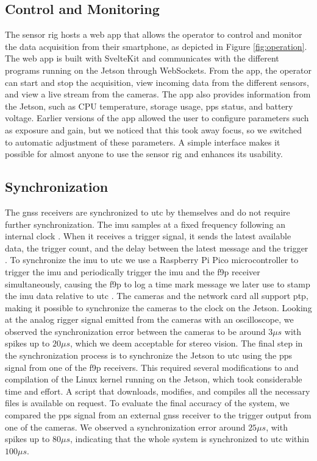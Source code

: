 \subsection{Control and Monitoring}
The sensor rig hosts a web app that allows the operator to control and monitor the data acquisition from their smartphone, as depicted in Figure \ref{fig:operation}.
The web app is built with SvelteKit and communicates with the different programs running on the Jetson through WebSockets.
From the app, the operator can start and stop the acquisition, view incoming data from the different sensors, and view a live stream from the cameras.
The app also provides information from the Jetson, such as CPU temperature, storage usage, \gls{pps} status, and battery voltage.
Earlier versions of the app allowed the user to configure parameters such as exposure and gain, but we noticed that this took away focus, so we switched to automatic adjustment of these parameters.
A simple interface makes it possible for almost anyone to use the sensor rig and enhances its usability.


\subsection{Synchronization}
The \gls{gnss} receivers are synchronized to \gls{utc} by themselves and do not require further synchronization.
The \gls{imu} samples at a fixed frequency following an internal clock \cite{safranSTIM300Datasheet}.
When it receives a trigger signal, it sends the latest available data, the trigger count, and the delay between the latest message and the trigger \cite{safranSTIM300Datasheet}.
To synchronize the \gls{imu} to \gls{utc} we use a Raspberry Pi Pico microcontroller to trigger the \gls{imu} and periodically trigger the \gls{imu} and the \gls{f9p} receiver simultaneously, causing the \gls{f9p} to log a time mark message we later use to stamp the \gls{imu} data relative to \gls{utc} \cite[190]{u-bloxZEDF9PInterfaceDescription}.
The cameras and the network card all support \gls{ptp}, making it possible to synchronize the cameras to the clock on the Jetson.
Looking at the analog rigger signal emitted from the cameras with an oscilloscope, we observed the synchronization error between the cameras to be around $3\mu s$ with spikes up to $20\mu s$, which we deem acceptable for stereo vision.
The final step in the synchronization process is to synchronize the Jetson to \gls{utc} using the \gls{pps} signal from one of the \gls{f9p} receivers.
This required several modifications to and compilation of the Linux kernel running on the Jetson, which took considerable time and effort.
A script that downloads, modifies, and compiles all the necessary files is available on request.
To evaluate the final accuracy of the system, we compared the \gls{pps} signal from an external \gls{gnss} receiver to the trigger output from one of the cameras. 
We observed a synchronization error around $25\mu s$, with spikes up to $80\mu s$, indicating that the whole system is synchronized to \gls{utc} within $100\mu s$.







